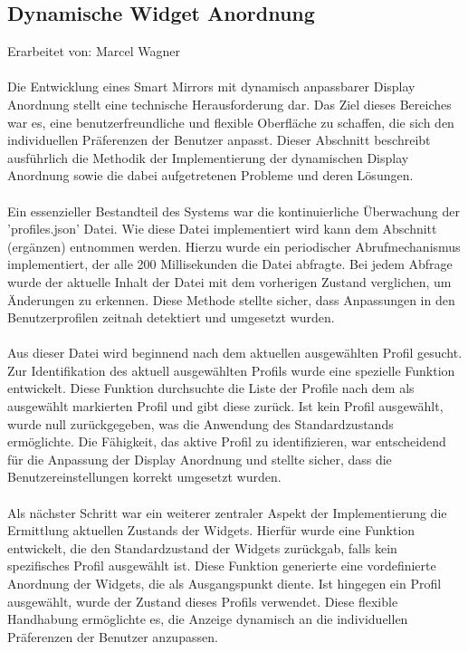 \subsection{Dynamische Widget Anordnung}
Erarbeitet von: Marcel Wagner \\ \\
Die Entwicklung eines Smart Mirrors mit dynamisch anpassbarer Display Anordnung stellt eine technische Herausforderung dar. Das Ziel dieses Bereiches war es, eine benutzerfreundliche und flexible Oberfläche zu schaffen, die sich den individuellen Präferenzen der Benutzer anpasst. Dieser Abschnitt beschreibt ausführlich die Methodik der Implementierung der dynamischen Display Anordnung sowie die dabei aufgetretenen Probleme und deren Lösungen. \\ \\
Ein essenzieller Bestandteil des Systems war die kontinuierliche Überwachung der 'profiles.json' Datei. Wie diese Datei implementiert wird kann dem Abschnitt (ergänzen) entnommen werden. Hierzu wurde ein periodischer Abrufmechanismus implementiert, der alle 200 Millisekunden die Datei abfragte. Bei jedem Abfrage wurde der aktuelle Inhalt der Datei mit dem vorherigen Zustand verglichen, um Änderungen zu erkennen. Diese Methode stellte sicher, dass Anpassungen in den Benutzerprofilen zeitnah detektiert und umgesetzt wurden. \\ \\
Aus dieser Datei wird beginnend nach dem aktuellen ausgewählten Profil gesucht. Zur Identifikation des aktuell ausgewählten Profils wurde eine spezielle Funktion entwickelt. Diese Funktion durchsuchte die Liste der Profile nach dem als ausgewählt markierten Profil und gibt diese zurück. Ist kein Profil ausgewählt, wurde null zurückgegeben, was die Anwendung des Standardzustands ermöglichte. Die Fähigkeit, das aktive Profil zu identifizieren, war entscheidend für die Anpassung der Display Anordnung und stellte sicher, dass die Benutzereinstellungen korrekt umgesetzt wurden. \\ \\
Als nächster Schritt war ein weiterer zentraler Aspekt der Implementierung die Ermittlung aktuellen Zustands der Widgets. Hierfür wurde eine Funktion entwickelt, die den Standardzustand der Widgets zurückgab, falls kein spezifisches Profil ausgewählt ist. Diese Funktion generierte eine vordefinierte Anordnung der Widgets, die als Ausgangspunkt diente. Ist hingegen ein Profil ausgewählt, wurde der Zustand dieses Profils verwendet. Diese flexible Handhabung ermöglichte es, die Anzeige dynamisch an die individuellen Präferenzen der Benutzer anzupassen. \\ \\
